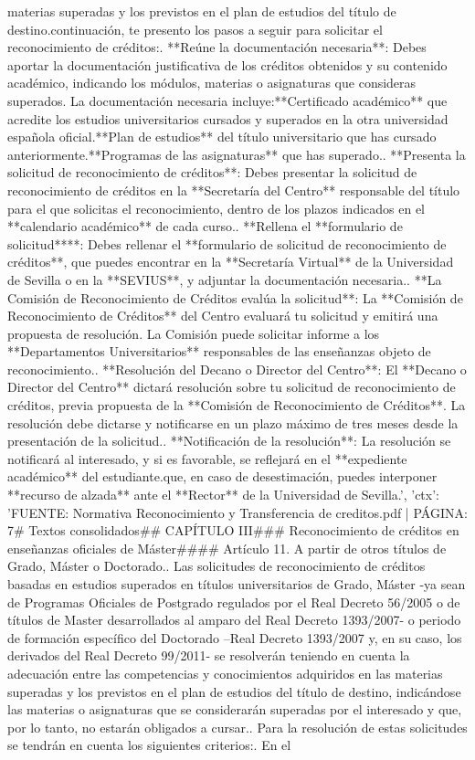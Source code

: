 \documentclass{article}
\begin{document}
\begin{itemize}
materias superadas y los previstos en el plan de estudios del título de destino.\n\nA continuación, te presento los pasos a seguir para solicitar el reconocimiento de créditos:\n{}. **Reúne la documentación necesaria**: Debes aportar la documentación justificativa de los créditos obtenidos y su contenido académico, indicando los módulos, materias o asignaturas que consideras superados. La documentación necesaria incluye:\n * **Certificado académico** que acredite los estudios universitarios cursados y superados en la otra universidad española oficial.\n * **Plan de estudios** del título universitario que has cursado anteriormente.\n * **Programas de las asignaturas** que has superado.. **Presenta la solicitud de reconocimiento de créditos**: Debes presentar la solicitud de reconocimiento de créditos en la **Secretaría del Centro** responsable del título para el que solicitas el reconocimiento, dentro de los plazos indicados en el **calendario académico** de cada curso.. **Rellena el **formulario de solicitud****: Debes rellenar el **formulario de solicitud de reconocimiento de créditos**, que puedes encontrar en la **Secretaría Virtual** de la Universidad de Sevilla o en la **SEVIUS**, y adjuntar la documentación necesaria.. **La Comisión de Reconocimiento de Créditos evalúa la solicitud**: La **Comisión de Reconocimiento de Créditos** del Centro evaluará tu solicitud y emitirá una propuesta de resolución. La Comisión puede solicitar informe a los **Departamentos Universitarios** responsables de las enseñanzas objeto de reconocimiento.. **Resolución del Decano o Director del Centro**: El **Decano o Director del Centro** dictará resolución sobre tu solicitud de reconocimiento de créditos, previa propuesta de la **Comisión de Reconocimiento de Créditos**. La resolución debe dictarse y notificarse en un plazo máximo de tres meses desde la presentación de la solicitud.. **Notificación de la resolución**: La resolución se notificará al interesado, y si es favorable, se reflejará en el **expediente académico** del estudiante.\n\nRecuerda que, en caso de desestimación, puedes interponer **recurso de alzada** ante el **Rector** de la Universidad de Sevilla.', 'ctx': 'FUENTE: Normativa Reconocimiento y Transferencia de creditos.pdf | PÁGINA: 7\n# Textos consolidados\n\n## CAPÍTULO III\n### Reconocimiento de créditos en enseñanzas oficiales de Máster\n\n#### Artículo 11. A partir de otros títulos de Grado, Máster o Doctorado.. Las solicitudes de reconocimiento de créditos basadas en estudios superados en títulos universitarios de Grado, Máster -ya sean de Programas Oficiales de Postgrado regulados por el Real Decreto 56/2005 o de títulos de Master desarrollados al amparo del Real Decreto 1393/2007- o periodo de formación específico del Doctorado –Real Decreto 1393/2007 y, en su caso, los derivados del Real Decreto 99/2011- se resolverán teniendo en cuenta la adecuación entre las competencias y conocimientos adquiridos en las materias superadas y los previstos en el plan de estudios del título de destino, indicándose las materias o asignaturas que se considerarán superadas por el interesado y que, por lo tanto, no estarán obligados a cursar.\n{}. Para la resolución de estas solicitudes se tendrán en cuenta los siguientes criterios:. En el 
\end{itemize}
\end{document}
